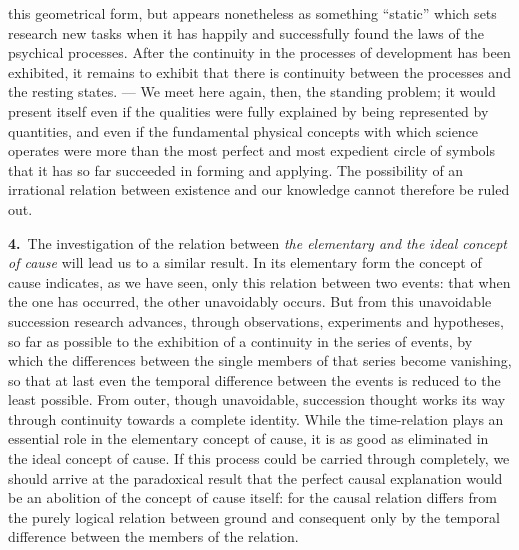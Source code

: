 \documentclass[12pt,a4paper]{book}
\newcommand{\opage}[1]{\marginnote{\footnotesize\textit{[#1]}}}
\begin{document}
this geometrical form, but appears nonetheless as something ``static'' which
sets research new tasks when it has happily and successfully found the laws of
the psychical processes. After the continuity in the processes of development
has been exhibited, it remains to exhibit that there is continuity between the
processes and the resting states. --- We meet here again, then, the standing
problem; it would present itself even if the qualities were fully explained by
being represented by quantities, and even if the fundamental physical concepts
with which science operates were more than the most perfect and most expedient
circle of symbols that it has so far succeeded in forming and applying. \opage{43}The
possibility of an irrational relation between existence and our knowledge cannot
therefore be ruled out.

\noindent\textbf{4.}~The investigation of the relation between \emph{the
elementary and the ideal concept of cause} will lead us to a similar result. In
its elementary form the concept of cause indicates, as we have seen, only this
relation between two events: that when the one has occurred, the other
unavoidably occurs. But from this unavoidable succession research advances,
through observations, experiments and hypotheses, so far as possible to the
exhibition of a continuity in the series of events, by which the differences
between the single members of that series become vanishing, so that at last even
the temporal difference between the events is reduced to the least possible.
From outer, though unavoidable, succession thought works its way through
continuity towards a complete identity. While the time-relation plays an
essential role in the elementary concept of cause, it is as good as eliminated in
the ideal concept of cause. If this process could be carried through completely,
we should arrive at the paradoxical result that the perfect causal explanation
would be an abolition of the concept of cause itself: for the causal relation
differs from the purely logical relation between ground and consequent only by
the temporal difference between the members of the relation.
\end{document}
